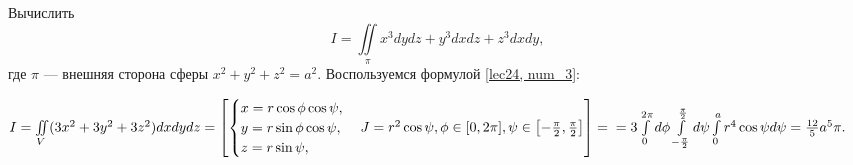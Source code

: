 \documentclass[../../main.tex]{subfiles}
\begin{document}
\begin{example}
	Вычислить $$I = \iint\limits_\pi x^3dydz + y^3dxdz + z^3dxdy,$$ где $\pi$ --- внешняя сторона сферы $x^2 + y^2 + z^2 = a^2.$
	Воспользуемся формулой \eqref{lec24, num_3}:
	
	$I=\iint\limits_V (3x^2 + 3y^2 + 3z^2)dxdydz = \left[ \begin{cases}x= r\cos\phi \cos\psi,\\ y=r\sin\phi\cos\psi, \\ z=r\sin\psi,\end{cases} J =r^2\cos\psi,\\ \phi\in[0, 2\pi], \psi\in\left[-\frac{\pi}{2},\frac{\pi}{2}\right]\right]=\\=3\int\limits_0^{2\pi}d\phi\int\limits_{-\frac{\pi}{2}}^{\frac{\pi}{2}}d\psi\int\limits_0^a r^4\cos\psi d\psi=\frac{12}{5}a^5\pi.$
\end{example}
\end{document}
